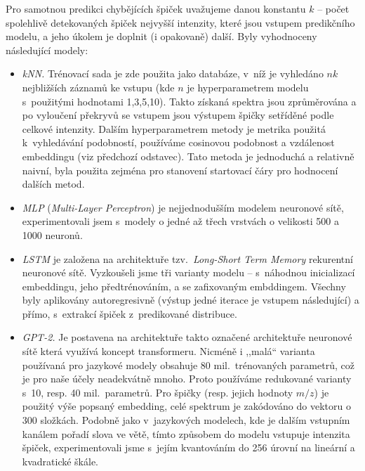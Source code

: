\documentclass[a4paper,11pt]{article}
\begin{document}
Pro samotnou predikci chybějících špiček 
uvažujeme danou konstantu $k$ -- počet spolehlivě detekovaných špiček nejvyšší intenzity,
které jsou vstupem predikčního modelu, a jeho úkolem je doplnit (i opakovaně) další. 
Byly vyhodnoceny následující modely:
\begin{itemize}
\item \emph{kNN.} Trénovací sada je zde použita jako databáze, v~níž je vyhledáno $nk$ nejbližších 
záznamů ke vstupu (kde $n$ je hyperparametrem modelu s~použitými hodnotami 1,3,5,10). 
Takto získaná spektra jsou zprůměrována a po vyloučení překryvů se vstupem jsou výstupem špičky setříděné
podle celkové intenzity.
Dalším hyperparametrem metody je metrika použitá k~vyhledávání podobností, používáme cosinovou podobnost
a vzdálenost embeddingu (viz předchozí odstavec).
Tato metoda je jednoduchá a relativně naivní, byla použita zejména pro stanovení startovací čáry pro hodnocení
dalších metod.
\item \emph{MLP} (\emph{Multi-Layer Perceptron}) je nejjednodušším modelem
neuronové sítě, experimentovali jsem s~modely o jedné až třech vrstvách o
velikosti 500 a 1000 neuronů.
\item \emph{LSTM} je založena na architektuře tzv.~\emph{Long-Short Term Memory} rekurentní neuronové sítě.
Vyzkoušeli jsme tři varianty modelu -- s~náhodnou inicializací embeddingu, jeho předtrénováním, a se zafixovaným embddingem.
Všechny byly aplikovány autoregresivně (výstup jedné iterace je vstupem následující) a přímo, s~extrakcí špiček z~predikované distribuce.

\item \emph{GPT-2.} Je postavena na architektuře takto označené architektuře neuronové sítě
která využívá koncept transformeru.
Nicméně i ,,malá`` varianta používaná pro jazykové modely obsahuje 80 mil.\ trénovaných parametrů,
což je pro naše účely neadekvátně mnoho. Proto používáme redukované varianty s~10, resp. 40 mil.\ parametrů.
Pro špičky (resp. jejich hodnoty $m/z$) je použitý výše popsaný embedding, celé spektrum je zakódováno do vektoru
o 300 složkách.
Podobně jako v~jazykových modelech, kde je dalším vstupním kanálem pořadí slova ve větě,
tímto způsobem do modelu vstupuje intenzita špiček, experimentovali jsme s~jejím kvantováním do 256 úrovní
na lineární a kvadratické škále.


\end{itemize}
\end{document}
